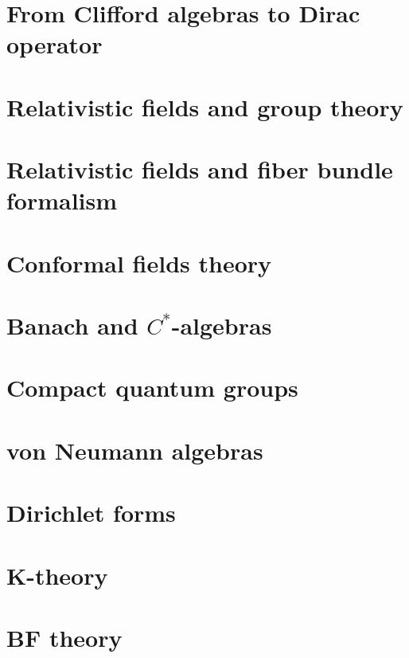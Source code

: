 \documentclass[a4paper,twoside,11pt]{book}
\begin{document}
\chapter{From Clifford algebras to Dirac operator}



\chapter{Relativistic fields and group theory}


\chapter{Relativistic fields and fiber bundle formalism}


\chapter{Conformal fields theory}


\chapter{Banach and \texorpdfstring{$C^*$}{C*}-algebras}




\chapter{Compact quantum groups}


\chapter{von Neumann algebras}





\chapter{Dirichlet forms}


\chapter{K-theory}


\chapter{BF theory}

\end{document}
